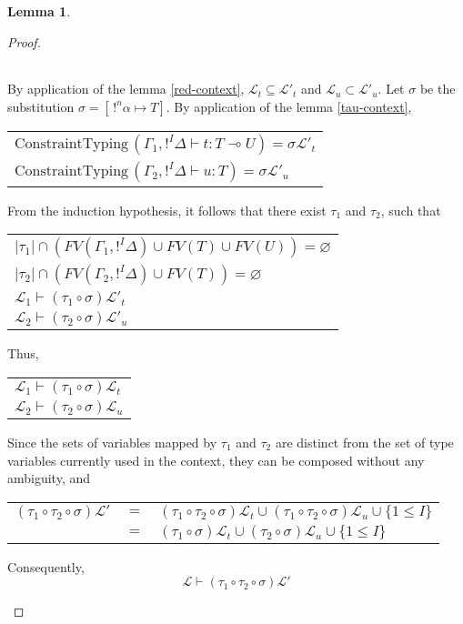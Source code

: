 \documentclass[10pt]{article}
\theoremstyle{plain}
\theoremstyle{definition}
\newtheorem{lemma}{Lemma}[section]
\begin{document}
\begin{lemma}
\begin{proof}
\begin{itemize}
\begin{center}
\begin{tabular}{l}
			 		\end{tabular}
			 		\end{center}
			 	By application of the lemma \ref{red-context}, $\mathcal{L}_t \subseteq \mathcal{L'}_t$ and $\mathcal{L}_u \subset \mathcal{L'}_u$.
			 	Let $\sigma$ be the substitution $\sigma = [\, !^n\alpha \mapsto T]$. By application of the lemma \ref{tau-context}, 
			 		\begin{center}
			 		\begin{tabular}{l}
			 			$\text{ConstraintTyping} \, (\Gamma_1, !^I \Delta \vdash t : T \multimap U) = \sigma \mathcal{L'}_t$ \\
			 			$\text{ConstraintTyping} \, (\Gamma_2, !^I \Delta \vdash u : T) = \sigma \mathcal{L'}_u$
			 		\end{tabular}
			 		\end{center}
			 	From the induction hypothesis, it follows that there exist $\tau_1$ and $\tau_2$, such that
			 		\begin{center}
			 		\begin{tabular}{l}
			 			$|\tau_1| \cap (FV(\Gamma_1, !^I\Delta) \cup FV(T) \cup FV(U)) = \varnothing$ \\
			 			$|\tau_2| \cap (FV(\Gamma_2, !^I\Delta) \cup FV(T)) = \varnothing$ \\
			 			$\mathcal{L}_1 \vdash (\tau_1 \circ \sigma) \mathcal{L'}_t$ \\
			 			$\mathcal{L}_2 \vdash (\tau_2 \circ \sigma) \mathcal{L'}_u$
			 		\end{tabular}
			 		\end{center}
			 	Thus,
			 		\begin{center}
			 		\begin{tabular}{l}
			 			$\mathcal{L}_1 \vdash (\tau_1 \circ \sigma) \mathcal{L}_t$ \\
			 			$\mathcal{L}_2 \vdash (\tau_2 \circ \sigma) \mathcal{L}_u$
			 		\end{tabular}
			 		\end{center}
			 	Since the sets of variables mapped by $\tau_1$ and $\tau_2$ are distinct from the set of type variables currently used in the context, 
			 	they can be composed without any ambiguity, and
			 		\begin{center}
			 		\begin{tabular}{lcl}
			 			$(\tau_1 \circ \tau_2 \circ \sigma) \mathcal{L}'$ & $=$ & 
				 			$(\tau_1 \circ \tau_2 \circ \sigma) \mathcal{L}_t \cup (\tau_1 \circ \tau_2 \circ \sigma) \mathcal{L}_u \cup \{1 \le I\}$ \\
				 		& $=$ & $(\tau_1 \circ \sigma) \mathcal{L}_t \cup (\tau_2 \circ \sigma) \mathcal{L}_u \cup \{1 \le I\}$
			 		\end{tabular}
			 		\end{center}
			 	Consequently,
			 		$$ \mathcal{L} \vdash (\tau_1 \circ \tau_2 \circ \sigma) \mathcal{L'} $$
		\end{itemize}
	\end{proof}
\end{lemma}
\end{document}
